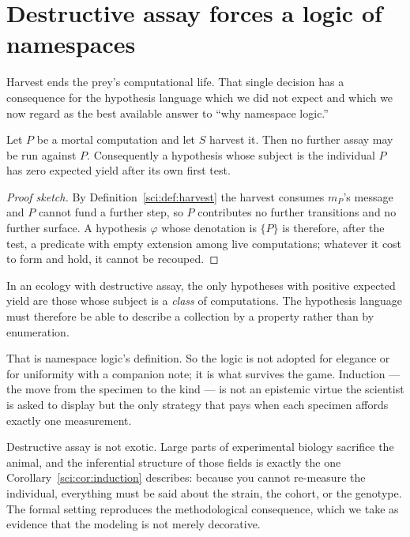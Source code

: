 \section{Destructive assay forces a logic of namespaces}\label{sci:S8}
\label{sci:sec:forced}

Harvest ends the prey's computational life. That single decision has a consequence for the hypothesis
language which we did not expect and which we now regard as the best available answer to ``why
namespace logic.''

\begin{proposition}
\label{sci:prop:onespecimen}
Let $P$ be a mortal computation and let $S$ harvest it. Then no further assay may be run against $P$.
Consequently a hypothesis whose subject is the individual $P$ has zero expected yield after its own
first test.
\end{proposition}

\begin{proof}[Proof sketch]
By Definition~\ref{sci:def:harvest} the harvest consumes $m_P$'s message and $P$ cannot fund a further
step, so $P$ contributes no further transitions and no further surface. A hypothesis $\varphi$ whose
denotation is $\{P\}$ is therefore, after the test, a predicate with empty extension among live
computations; whatever it cost to form and hold, it cannot be recouped.
\end{proof}

\begin{corollary}
\label{sci:cor:induction}
In an ecology with destructive assay, the only hypotheses with positive expected yield are those whose
subject is a \emph{class} of computations. The hypothesis language must therefore be able to describe
a collection by a property rather than by enumeration.
\end{corollary}

That is namespace logic's definition. So the logic is not adopted for elegance or for uniformity with
a companion note; it is what survives the game. Induction --- the move from the specimen to the kind
--- is not an epistemic virtue the scientist is asked to display but the only strategy that pays when
each specimen affords exactly one measurement.

\begin{remark}\label{sci:biological-reading}
Destructive assay is not exotic. Large parts of experimental biology sacrifice the animal, and the
inferential structure of those fields is exactly the one Corollary~\ref{sci:cor:induction} describes:
because you cannot re-measure the individual, everything must be said about the strain, the cohort, or
the genotype. The formal setting reproduces the methodological consequence, which we take as evidence
that the modeling is not merely decorative.
\end{remark}

